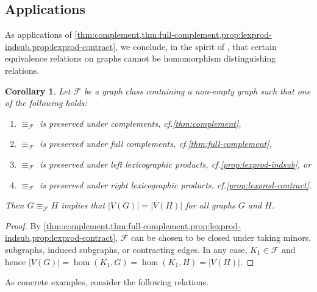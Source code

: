 \documentclass[3p,final]{elsarticle}
\newtheorem{corollary}[theorem]{Corollary}
\begin{document}
	
	\subsection{Applications}
	\label{sec:applications}
	
	As applications of \cref{thm:complement,thm:full-complement,prop:lexprod-indsub,prop:lexprod-contract}, we conclude, in the spirit of \cite{atserias_expressive_2021}, that certain equivalence relations on graphs cannot be homomorphism distinguishing relations.


	\begin{corollary} \label{cor:complement}
		Let $\mathcal{F}$ be a  graph class containing a non-empty graph such that one of the following holds:
		\begin{enumerate}
			\item $\equiv_{\mathcal{F}}$ is preserved under complements, cf.\@ \cref{thm:complement},
			\item $\equiv_{\mathcal{F}}$ is preserved under full complements, cf.\@ \cref{thm:full-complement},
			\item $\equiv_{\mathcal{F}}$ is preserved under left lexicographic products, cf.\@ \cref{prop:lexprod-indsub}, or
			\item $\equiv_{\mathcal{F}}$ is preserved under right lexicographic products, cf.\@ \cref{prop:lexprod-contract}.
		\end{enumerate}
		Then  $G \equiv_{\mathcal{F}} H$ implies that $|V(G)| = |V(H)|$ for all graphs $G$ and $H$.
	\end{corollary}
	\begin{proof}
		By \cref{thm:complement,thm:full-complement,prop:lexprod-indsub,prop:lexprod-contract}, $\mathcal{F}$ can be chosen to be closed under taking minors, subgraphs, induced subgraphs, or contracting edges.
		In any case, $K_1 \in \mathcal{F}$ and hence $|V(G)| = \hom(K_1, G) = \hom(K_1, H) = |V(H)|$.
	\end{proof}

	As concrete examples, consider the following relations. 
	
\end{document}
